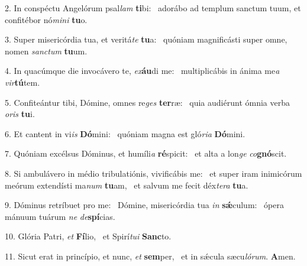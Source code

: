 2. In conspéctu Angelórum psal\textit{lam} \textbf{ti}bi: \ast\  adorábo ad templum sanctum tuum, et confitébor nó\textit{mi}\textit{ni} \textbf{tu}o.\

3. Super misericórdia tua, et veritá\textit{te} \textbf{tu}a: \ast\  quóniam magnificásti super omne, nomen \textit{sanc}\textit{tum} \textbf{tu}um.\

4. In quacúmque die invocávero te, \textit{ex}\textbf{áu}di me: \ast\  multiplicábis in ánima me\textit{a} \textit{vir}\textbf{tú}tem.\

5. Confiteántur tibi, Dómine, omnes re\textit{ges} \textbf{ter}ræ: \ast\  quia audiérunt ómnia verba \textit{o}\textit{ris} \textbf{tu}i.\

6. Et cantent in vi\textit{is} \textbf{Dó}mini: \ast\  quóniam magna est gló\textit{ri}\textit{a} \textbf{Dó}mini.\

7. Quóniam excélsus Dóminus, et humíli\textit{a} \textbf{ré}spicit: \ast\  et alta a lon\textit{ge} \textit{co}\textbf{gnó}scit.\

8. Si ambulávero in médio tribulatiónis, vivificábis me: \dag\  et super iram inimicórum meórum extendísti ma\textit{num} \textbf{tu}am, \ast\  et salvum me fecit déx\textit{te}\textit{ra} \textbf{tu}a.\

9. Dóminus retríbuet pro me: \dag\  Dómine, misericórdia tua \textit{in} \textbf{sǽ}culum: \ast\  ópera mánuum tuárum \textit{ne} \textit{de}\textbf{spí}cias.\

10. Glória Patri, \textit{et} \textbf{Fí}lio, \ast\  et Spirí\textit{tu}\textit{i} \textbf{Sanc}to.\

11. Sicut erat in princípio, et nunc, \textit{et} \textbf{sem}per, \ast\  et in sǽcula sæcu\textit{ló}\textit{rum}. \textbf{A}men.\

